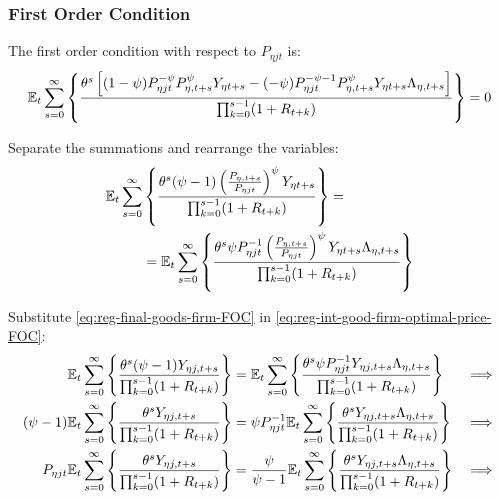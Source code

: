 \documentclass[
thesis.tex
]{subfiles}
\begin{document}

\subsubsection*{First Order Condition}

The first order condition with respect to $P_{\eta jt}$ is:
\begin{align}
	& \quad {\mathbb{E}_{t}} \sum_{s=0}^{\infty} \left\{ \frac{\theta^s \left[ (1-\psi) P_{\eta jt}^{-\psi} P_{\eta, t+s}^{\psi} Y_{\eta t+s} - (-\psi) P_{\eta jt}^{-\psi-1} P_{\eta, t+s}^{\psi} Y_{\eta t+s} \Lambda_{\eta, t+s} \right]}{\prod_{k=0}^{s-1}(1+R_{t+k})} \right\} = 0 \nonumber
\end{align}


Separate the summations and rearrange the variables:
\begin{align}
	\begin{split}
		{\mathbb{E}_{t}} \sum_{s=0}^{\infty} &\left\{ \frac{\theta^s (\psi-1) \left( \frac{P_{\eta, t+s}} {P_{\eta jt}} \right)^{\psi} Y_{\eta t+s}} {\prod_{k=0}^{s-1} (1+R_{t+k})} \right\} = \\
		&= {\mathbb{E}_{t}} \sum_{s=0}^{\infty} \left\{ \frac{\theta^s \psi P_{\eta jt}^{-1} \left( \frac{P_{\eta, t+s}} {P_{\eta jt}} \right)^{\psi} Y_{\eta t+s} \Lambda_{\eta, t+s}}{\prod_{k=0}^{s-1}(1+R_{t+k})} \right\} \label{eq:reg-int-good-firm-optimal-price-FOC}
	\end{split}
\end{align}


Substitute \ref{eq:reg-final-goods-firm-FOC} in \ref{eq:reg-int-good-firm-optimal-price-FOC}:
\begin{alignat}{2}
	{\mathbb{E}_{t}} \sum_{s=0}^{\infty} \Bigg\{ \frac{\theta^s (\psi-1) Y_{\eta j,t+s}}{\prod_{k=0}^{s-1}(1+R_{t+k})} \Bigg\} &= {\mathbb{E}_{t}} \sum_{s=0}^{\infty} \Bigg\{ \frac{\theta^s \psi P_{\eta jt}^{-1} Y_{\eta j,t+s} \Lambda_{\eta, t+s}}{\prod_{k=0}^{s-1}(1+R_{t+k})}  \Bigg\} &\implies \nonumber \\
	(\psi-1) {\mathbb{E}_{t}} \sum_{s=0}^{\infty} \Bigg\{ \frac{\theta^s Y_{\eta j,t+s}}{\prod_{k=0}^{s-1}(1+R_{t+k})} \Bigg\} &= \psi P_{\eta jt}^{-1} {\mathbb{E}_{t}} \sum_{s=0}^{\infty} \Bigg\{ \frac{\theta^s Y_{\eta j,t+s} \Lambda_{\eta, t+s}}{\prod_{k=0}^{s-1}(1+R_{t+k})}  \Bigg\} &\implies \nonumber \\
	P_{\eta jt} {\mathbb{E}_{t}} \sum_{s=0}^{\infty} \Bigg\{ \frac{\theta^s Y_{\eta j,t+s}}{\prod_{k=0}^{s-1}(1+R_{t+k})} \Bigg\} &= \frac{\psi}{\psi-1} {\mathbb{E}_{t}} \sum_{s=0}^{\infty} \Bigg\{ \frac{\theta^s Y_{\eta j,t+s} \Lambda_{\eta, t+s}}{\prod_{k=0}^{s-1}(1+R_{t+k})}  \Bigg\} &\implies \nonumber
\end{alignat}
\end{document}
